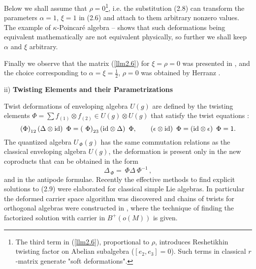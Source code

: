 \documentclass[a4paper,12pt,showkeys]{article}
\begin{document}
Below we shall assume that $\rho =0$\footnote{The
 third term in (\ref{llm2.6}), proportional to $\rho$, introduces
 Reshetikhin twisting factor on Abelian subalgebra
 ($[e_2, e_3] =0$). Such terms in classical $r$-matrix
 generate "soft deformations".}, i.e. the
 substitution (2.8) can transform the parameters $\alpha = 1$,
 $\xi=1$ in (2.6) and attach to them arbitrary nonzero values.
The example of $\kappa$-Poincar\'{e} algebra
  \cite{ll2}--\cite{ll14}
 shows that
 such deformations being equivalent
 mathematically are
 not equivalent physically, so further
 we shall keep $\alpha$ and $\xi$ arbitrary.

 Finally we observe that the
  matrix (\ref{llm2.6}) for $\xi=\rho=0$ was presented in
   \cite{ll1},
and the choice corresponding to $\alpha= \xi= \frac{1}{2}$,
$\rho=0$  was obtained by Herranz
 \cite{ll8}.

ii) {\bf Twisting Elements and their Parametrizations}


Twist deformations of enveloping algebra $U(g)$
 are defined by the
twisting elements ${\Phi }=\sum f_{\left( 1\right) }\otimes
f_{\left(
2\right) }\in U(g)\otimes U(g)$ that satisfy the twist equations
 \cite{ll9}%
:
\begin{equation}\label{llm2.9}
\left( {\Phi }\right) _{12}\left( \Delta \otimes {\rm id}\right) {\ \Phi }%
=\left( {\ \Phi }\right) _{23}\left( {\rm id}\otimes \Delta \right) {\ \Phi }%
,\qquad \left( \epsilon \otimes {\rm id}\right) {\ \Phi }=\left( {\rm id}%
\otimes \epsilon \right) {\ \Phi }=1.  \label{twist-eq}
\end{equation}%
The quantized algebra $U_{{\ \Phi }}(g)$ has the same commutation
relations as the classical enveloping algebra   $U(g)$, the
deformation is present only in the new
coproducts that can be obtained in the form
\begin{equation}\label{xxx}
 \Delta _{{\ \Phi }}={\ \Phi }
\Delta {\ \Phi }^{-1}\, ,
\end{equation}
and in the antipode formulae.
Recently the effective methods to find explicit solutions to
(2.9) were elaborated
 \cite{ll10,ll11}
 for classical simple Lie
algebras. In particular the deformed carrier space algorithm was
discovered
  \cite{ll15}
 and chains of twists for orthogonal algebras
were constructed in
 \cite{ll16}, where the technique of
finding the factorized solution with carrier  in
$B^{+}(o(M))$ is given.
\end{document}
